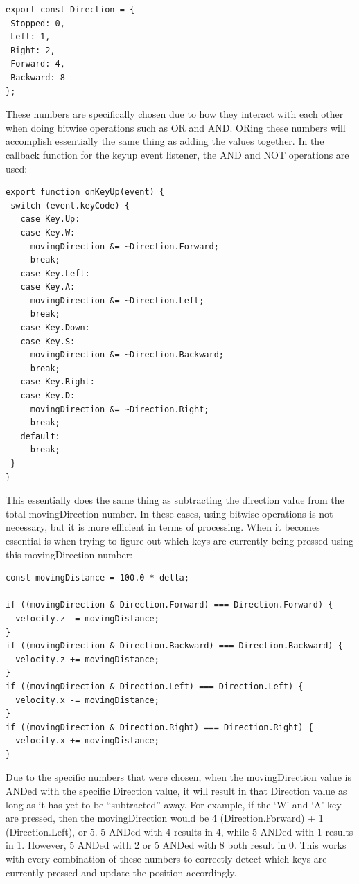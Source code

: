 \documentclass[onecolumn, draftclsnofoot,10pt, compsoc]{IEEEtran}
\begin{document}
\begin{lstlisting}
export const Direction = {
 Stopped: 0,
 Left: 1,
 Right: 2,
 Forward: 4,
 Backward: 8
};
\end{lstlisting}

These numbers are specifically chosen due to how they interact with each other when doing bitwise operations such as OR and AND. ORing these numbers will accomplish essentially the same thing as adding the values together. In the callback function for the keyup event listener, the AND and NOT operations are used:

\begin{lstlisting}
export function onKeyUp(event) {
 switch (event.keyCode) {
   case Key.Up:
   case Key.W:
     movingDirection &= ~Direction.Forward;
     break;
   case Key.Left:
   case Key.A:
     movingDirection &= ~Direction.Left;
     break;
   case Key.Down:
   case Key.S:
     movingDirection &= ~Direction.Backward;
     break;
   case Key.Right:
   case Key.D:
     movingDirection &= ~Direction.Right;
     break;
   default:
     break;
 }
}
\end{lstlisting}

This essentially does the same thing as subtracting the direction value from the total movingDirection number. In these cases, using bitwise operations is not necessary, but it is more efficient in terms of processing. When it becomes essential is when trying to figure out which keys are currently being pressed using this movingDirection number:

\begin{lstlisting}
const movingDistance = 100.0 * delta;

if ((movingDirection & Direction.Forward) === Direction.Forward) {
  velocity.z -= movingDistance;
}
if ((movingDirection & Direction.Backward) === Direction.Backward) {
  velocity.z += movingDistance;
}
if ((movingDirection & Direction.Left) === Direction.Left) {
  velocity.x -= movingDistance;
}
if ((movingDirection & Direction.Right) === Direction.Right) {
  velocity.x += movingDistance;
}
\end{lstlisting}

Due to the specific numbers that were chosen, when the movingDirection value is ANDed with the specific Direction value, it will result in that Direction value as long as it has yet to be “subtracted” away. For example, if the ‘W’ and ‘A’ key are pressed, then the movingDirection would be 4 (Direction.Forward) + 1 (Direction.Left), or 5.  5 ANDed with 4 results in 4, while 5 ANDed with 1 results in 1. However, 5 ANDed with 2 or 5 ANDed with 8 both result in 0. This works with every combination of these numbers to correctly detect which keys are currently pressed and update the position accordingly.
\end{document}
